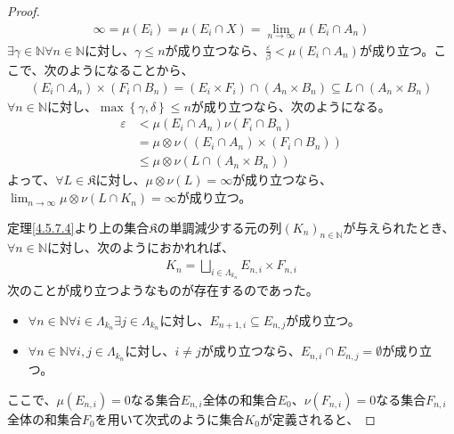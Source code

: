\documentclass[dvipdfmx]{jsarticle}
\begin{document}
\begin{proof}
\begin{align*}
\infty = \mu\left( E_{i} \right) = \mu\left( E_{i} \cap X \right) = \lim_{n \rightarrow \infty}{\mu\left( E_{i} \cap A_{n} \right)}
\end{align*}
$\exists\gamma \in \mathbb{N}\forall n \in \mathbb{N}$に対し、$\gamma \leq n$が成り立つなら、$\frac{\varepsilon}{\beta} < \mu\left( E_{i} \cap A_{n} \right)$が成り立つ。ここで、次のようになることから、
\begin{align*}
\left( E_{i} \cap A_{n} \right) \times \left( F_{i} \cap B_{n} \right) = \left( E_{i} \times F_{i} \right) \cap \left( A_{n} \times B_{n} \right) \subseteq L \cap \left( A_{n} \times B_{n} \right)
\end{align*}
$\forall n \in \mathbb{N}$に対し、$\max\left\{ \gamma,\delta \right\} \leq n$が成り立つなら、次のようになる。
\begin{align*}
\varepsilon &< \mu\left( E_{i} \cap A_{n} \right)\nu\left( F_{i} \cap B_{n} \right)\\
&= \mu \otimes \nu\left( \left( E_{i} \cap A_{n} \right) \times \left( F_{i} \cap B_{n} \right) \right)\\
&\leq \mu \otimes \nu\left( L \cap \left( A_{n} \times B_{n} \right) \right)
\end{align*}
よって、$\forall L \in \mathfrak{K}$に対し、$\mu \otimes \nu(L) = \infty$が成り立つなら、$\lim_{n \rightarrow \infty}{\mu \otimes \nu\left( L \cap K_{n} \right)} = \infty$が成り立つ。\par
定理\ref{4.5.7.4}より上の集合$\mathfrak{K}$の単調減少する元の列$\left( K_{n} \right)_{n \in \mathbb{N}}$が与えられたとき、$\forall n \in \mathbb{N}$に対し、次のようにおかれれば、
\begin{align*}
K_{n} = \bigsqcup_{i \in \varLambda_{k_{n}}} {E_{n,i} \times F_{n,i}}
\end{align*}
次のことが成り立つようなものが存在するのであった。
\begin{itemize}
\item
  $\forall n \in \mathbb{N}\forall i \in \varLambda_{k_{n}}\exists j \in \varLambda_{k_{n}}$に対し、$E_{n + 1,i} \subseteq E_{n,j}$が成り立つ。
\item
  $\forall n \in \mathbb{N}\forall i,j \in \varLambda_{k_{n}}$に対し、$i \neq j$が成り立つなら、$E_{n,i} \cap E_{n,j} = \emptyset$が成り立つ。
\end{itemize}
ここで、$\mu\left( E_{n,i} \right) = 0$なる集合$E_{n,i}$全体の和集合$E_{0}$、$\nu\left( F_{n,i} \right) = 0$なる集合$F_{n,i}$全体の和集合$F_{0}$を用いて次式のように集合$K_{0}$が定義されると、

\end{proof}
\end{document}
